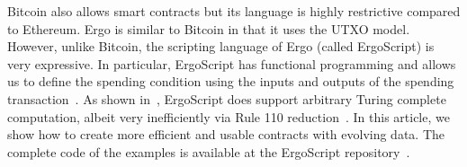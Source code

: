 \documentclass[11pt]{article}
\newcommand{\langname}{ErgoScript\xspace}
\begin{document}
Bitcoin also allows smart contracts but its language is highly restrictive compared to Ethereum. Ergo is similar to Bitcoin in that it uses the UTXO model. However, unlike Bitcoin, the scripting language of Ergo (called \langname) is very expressive. In particular, \langname has functional programming and allows us to 
define the spending condition using the inputs and outputs of the spending transaction~\cite{whitepaper}. As shown in~\cite{CKM18a}, \langname does support arbitrary Turing complete computation, albeit very inefficiently via Rule 110 reduction~\cite{NW06}. In this article, we show how to create more efficient and usable contracts with evolving data. The complete code of the examples is available at the \langname repository~\cite{langrepo}.%

%
%
\end{document}
